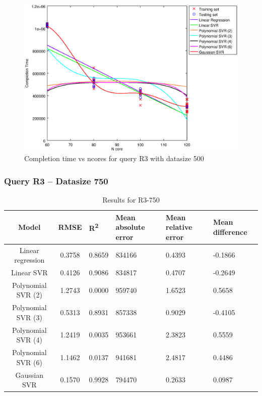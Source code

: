 \documentclass[a4paper,11pt]{article}
\begin{document}
\begin {figure}[hbtp]
\centering
\includegraphics[width=\textwidth]{output/R3_500_ONLY_1_LINEAR_NCORE/plot_R3_500.eps}
\caption{Completion time vs ncores for query R3 with datasize 500}
\label{fig:coreonly_linear_R3_500}
\end {figure}

\newpage
\subsubsection{Query R3 -- Datasize 750}
\begin{table}[H]
	\centering
	\begin{adjustbox}{center}
		\begin{tabular}{c | c M{1.2cm} M{2.5cm} M{2.5cm} M{1.8cm}}
			Model & RMSE & R\textsuperscript{2} & Mean absolute error & Mean relative error & Mean difference \tabularnewline
			\hline
			Linear regression & 0.3758 & 0.8659 & 834166 & 0.4393 & -0.1866 \\
			Linear SVR & 0.4126 & 0.9086 & 834817 & 0.4707 & -0.2649 \\
			Polynomial SVR (2) & 1.2743 & 0.0000 & 959740 & 1.6523 & 0.5658 \\
			Polynomial SVR (3) & 0.5313 & 0.8931 & 857338 & 0.9029 & -0.4105 \\
			Polynomial SVR (4) & 1.2419 & 0.0035 & 953661 & 2.3823 & 0.5559 \\
			Polynomial SVR (6) & 1.1462 & 0.0137 & 941681 & 2.4817 & 0.4486 \\
			Gaussian SVR & 0.1570 & 0.9928 & 794470 & 0.2633 & 0.0987 \\
		\end{tabular}
	\end{adjustbox}
	\\
	\caption{Results for R3-750}
	\label{fig:coreonly_linear_R3_750}
\end{table}
\end{document}
